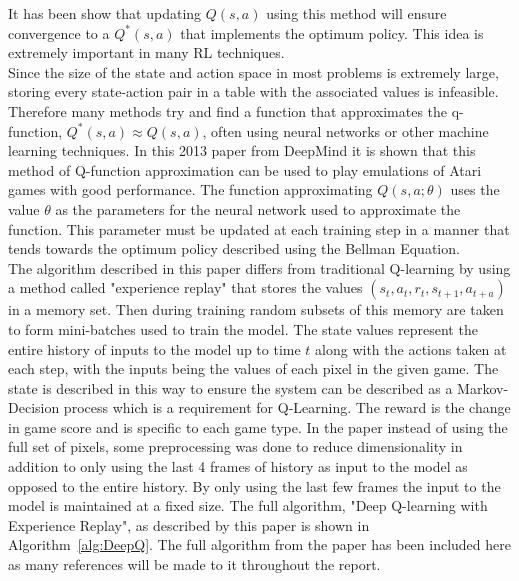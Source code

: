 \documentclass{article}
\begin{document}
It has been show that updating $Q(s,a)$ using this method will ensure convergence to a $Q^*(s,a)$ that implements the optimum policy\cite{Watkins1992Q-Learning}. This idea is extremely important in many RL techniques.
\\
Since the size of the state and action space in most problems is extremely large, storing every state-action pair in a table with the associated values is infeasible. Therefore many methods try and find a function that approximates the q-function, $Q^*(s,a) \approx Q(s,a)$, often using neural networks or other machine learning techniques. In this 2013 paper from DeepMind \cite{MnihPlayingLearning} it is shown that this method of Q-function approximation can be used to play emulations of Atari games with good performance. The function approximating $Q(s,a ; \theta)$ uses the value $\theta$ as the parameters for the neural network used to approximate the function. This parameter must be updated at each training step in a manner that tends towards the optimum policy described using the Bellman Equation.
\\ 
\sloppy The algorithm described in this paper differs from traditional Q-learning\cite{SuttonReinforcementProgress} by using a method called "experience replay" that stores the values $(s_t, a_t, r_t, s_{t+1}, a_{t+a})$ in a memory set. Then during training random subsets of this memory are taken to form mini-batches used to train the model. The state values represent the entire history of inputs to the model up to time $t$ along with the actions taken at each step, with the inputs being the values of each pixel in the given game. The state is described in this way to ensure the system can be described as a Markov-Decision process which is a requirement for Q-Learning. The reward is the change in game score and is specific to each game type. In the paper instead of using the full set of pixels, some preprocessing was done to reduce dimensionality in addition to only using the last 4 frames of history as input to the model as opposed to the entire history. By only using the last few frames the input to the model is maintained at a fixed size. The full algorithm, "Deep Q-learning with Experience Replay", as described by this paper is shown in Algorithm~\ref{alg:DeepQ}. The full algorithm from the paper has been included here as many references will be made to it throughout the report. 
\end{document}
